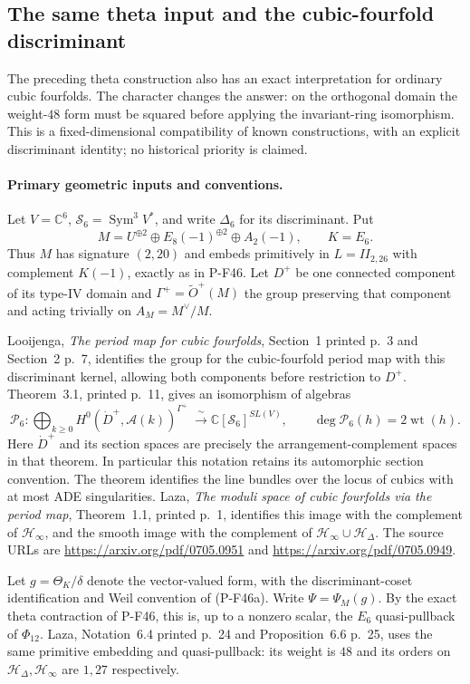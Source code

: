 \subsection{The same theta input and the cubic-fourfold discriminant}

The preceding theta construction also has an exact interpretation for
ordinary cubic fourfolds. The character changes the answer: on the
orthogonal domain the weight-$48$ form must be squared before applying
the invariant-ring isomorphism. This is a fixed-dimensional
compatibility of known constructions, with an explicit discriminant
identity; no historical priority is claimed.

\paragraph{Primary geometric inputs and conventions.}
Let $V=\mathbb C^6$, $\mathscr S_6=\operatorname{Sym}^3V^*$,
and write $\Delta_6$ for its discriminant. Put
\[
 M=U^{\oplus2}\oplus E_8(-1)^{\oplus2}\oplus A_2(-1),
 \qquad K=E_6.
\]
Thus $M$ has signature $(2,20)$ and embeds primitively in
$L=II_{2,26}$ with complement $K(-1)$, exactly as in P-F46.
Let $D^+$ be one connected component of its type-IV domain and
$\Gamma^+=\widetilde O^+(M)$ the group preserving that component
and acting trivially on $A_M=M^\vee/M$.

Looijenga, \emph{The period map for cubic fourfolds}, Section~1
printed p.~3 and Section~2 p.~7, identifies the group for the
cubic-fourfold period map with this discriminant kernel, allowing
both components before restriction to $D^+$. Theorem~3.1,
printed p.~11, gives an isomorphism of algebras
\[
 \mathcal P_6:\bigoplus_{k\ge0}
 H^0(\dot D^+,\mathcal A(k))^{\Gamma^+}
       \ \xrightarrow{\ \sim\ }
 \mathbb C[\mathscr S_6]^{SL(V)},
 \qquad \deg\mathcal P_6(h)=2\operatorname{wt}(h).
 \tag{P-F55a}
\]
Here $\dot D^+$ and its section spaces are precisely the
arrangement-complement spaces in that theorem. In particular this
notation retains its automorphic section convention. The theorem
identifies the line bundles over the locus of cubics with at most
ADE singularities. Laza, \emph{The moduli space of cubic fourfolds
via the period map}, Theorem~1.1, printed p.~1, identifies this
image with the complement of $\mathcal H_\infty$, and the smooth
image with the complement of
$\mathcal H_\infty\cup\mathcal H_\Delta$.
The source URLs are
\url{https://arxiv.org/pdf/0705.0951} and
\url{https://arxiv.org/pdf/0705.0949}.

Let $g=\Theta_K/\delta$ denote the vector-valued form, with the
discriminant-coset identification and Weil convention of (P-F46a).
Write $\Psi=\Psi_M(g)$. By the exact theta contraction of P-F46,
this is, up to a nonzero scalar, the $E_6$ quasi-pullback of
$\Phi_{12}$. Laza, Notation~6.4 printed p.~24 and
Proposition~6.6 p.~25, uses the same primitive embedding and
quasi-pullback: its weight is $48$ and its orders on
$\mathcal H_\Delta,\mathcal H_\infty$ are $1,27$ respectively.

